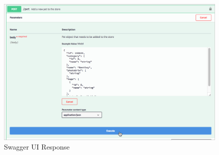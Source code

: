 \begin{figure}[!ht]
  \centering\includegraphics[width=\columnwidth]{images/swaggerui_execute.png}
  \caption{Swagger UI Response}\label{f:swagger-resp}
\end{figure}
